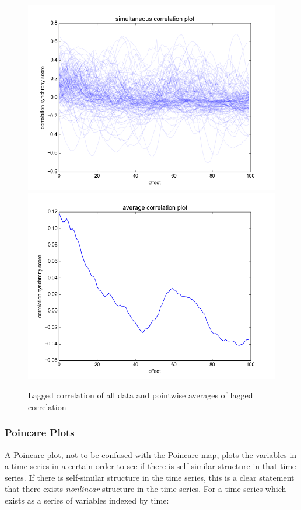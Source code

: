 \documentclass[12pt]{article}
\begin{document}
\begin{figure}\label{fig:lag_correlation}
  \begin{center}
    \includegraphics[scale=0.6]{correlation_mc}
    \includegraphics[scale=0.6]{correlation_summary}
  \end{center}
  \caption{Lagged correlation of all data and pointwise averages of lagged correlation}
\end{figure}

\subsubsection{Poincare Plots}

A Poincare plot\cite{hrv1}, not to be confused with the Poincare map, plots the variables in a time series in a certain order to see if there is self-similar structure in that time series. If there is self-similar structure in the time series, this is a clear statement that there exists \emph{nonlinear} structure in the time series\cite{hrv1}. For a time series which exists as a series of variables indexed by time:
\end{document}
